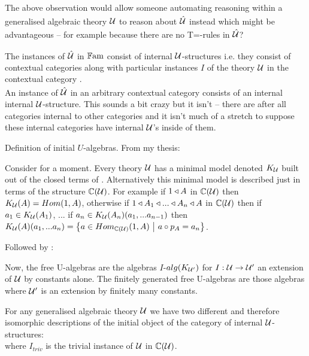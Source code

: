 \documentclass[10pt,a4paper]{article}
\theoremstyle{remark}
\begin{document}
\begin{notebox}[Question]
The above observation would allow someone automating reasoning within  a generalised algebraic theory 
$\gatU$ to reason about $\hatU$ instead which might be advantageous -- 
for example because there are no T=-rules in  $\hatU$?
\end{notebox}

\note 
The instances of $\hatU$  in $\Fam$ consist of  internal $\gat[U]$-structures  i.e. they consist of contextual categories \catcw along with particular instances $I$ of
the theory $\gat[U]$ in the contextual category \catc. \\
\note
An instance of $\hatU$ in an arbitrary contextual category
consists of  an internal internal $\gat[U]$-structure. This sounds a bit crazy but it isn't -- there are after all categories internal to other categories and it isn't much of a stretch to suppose these internal categories have internal $\gat[U]$'s inside of them. 

\note 
Definition of initial $U$-algebras. From my thesis:
\begin{tightquote}
Consider for a moment. Every theory $\gat[U]$ has a minimal model denoted $\KU$ built out of the closed terms of \gat[U]. Alternatively this minimal model is described just in terms of the structure $\CofU$. For example
if $1 \base A$ in $\CofU$ then 
$\KU(A)=Hom(1,A)$, otherwise if $1 \base A_1 \base ... \base A_n \base A$ in $\CofU$
then if $a_1 \in \KU(A_1)$, ... if $a_n \in \KU(A_n)(a_1,...a_{n-1})$ then 
$\KU(A)(a_1,...a_n)=\setsuchthat{a\in Hom_{\CofU}(1,A)}{a \circ p_A = a_n}$. \\
\end{tightquote} 

Followed by :
\begin{tightquote}
Now, the free U-algebras are the algebras $I$-$alg(\KUp)$ for $I: \gat[U] \morph \gat[U']$ an extension of $\gat[U]$ by constants alone. The finitely generated free U-algebras are those algebras where $\gat[U']$ is an extension by finitely many constants. \\
\end{tightquote}

\note
\label{termmodelEQfreealgebra}For any generalised algebraic theory $\gat[U]$ we have two different 
and therefore isomorphic descriptions of the initial object of the category of internal $\gatU$-structures:\\
where $I_{triv}$ is the trivial instance of $\gatU$ in $\CofU$.
\end{document}
